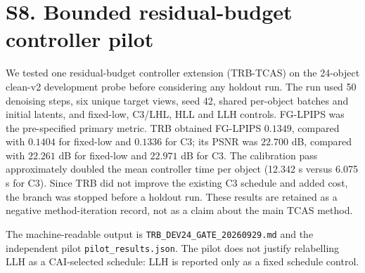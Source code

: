 \documentclass[10pt]{article}
\begin{document}
\section{S8. Bounded residual-budget controller pilot}

We tested one residual-budget controller extension (TRB-TCAS) on the
24-object clean-v2 development probe before considering any holdout run. The
run used 50 denoising steps, six unique target views, seed 42, shared
per-object batches and initial latents, and fixed-low, C3/LHL, HLL and LLH
controls. FG-LPIPS was the pre-specified primary metric. TRB obtained
FG-LPIPS $0.1349$, compared with $0.1404$ for fixed-low and $0.1336$ for C3;
its PSNR was $22.700$ dB, compared with $22.261$ dB for fixed-low and
$22.971$ dB for C3. The calibration pass approximately doubled the mean
controller time per object (12.342 s versus 6.075 s for C3). Since TRB did
not improve the existing C3 schedule and added cost, the branch was stopped
before a holdout run. These results are retained as a negative method-iteration
record, not as a claim about the main TCAS method.

The machine-readable output is
\texttt{TRB\_DEV24\_GATE\_20260929.md} and the independent pilot
\texttt{pilot\_results.json}. The pilot does not justify relabelling LLH as a
CAI-selected schedule: LLH is reported only as a fixed schedule control.
\end{document}
